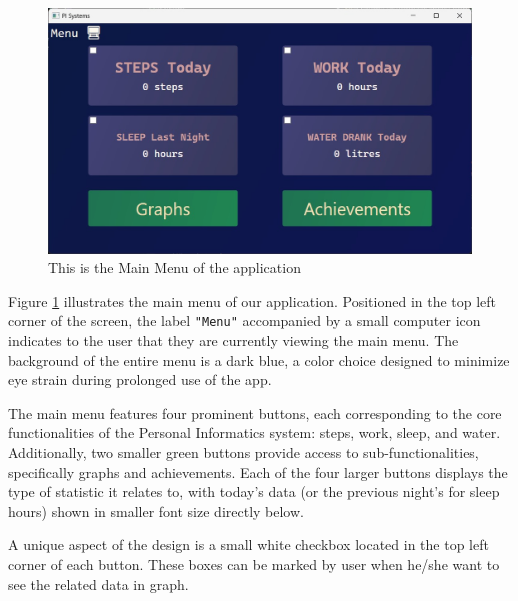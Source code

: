 \documentclass[12pt]{article}
\begin{document}
\begin{figure}[h!]
  \centering
  \includegraphics[width = \linewidth]{Main Menu}
  \caption{This is the Main Menu of the application}
  \label{fig:Menu}
\end{figure}

Figure \ref{fig:Menu} illustrates the main menu of our application. Positioned in the top left
corner of the screen, the label \texttt{"Menu"} accompanied by a small computer icon indicates
to the user that they are currently viewing the main menu. The background of the 
entire menu is a dark blue, a color choice designed to minimize eye strain during 
prolonged use of the app.\par

The main menu features four prominent buttons, each corresponding to the core 
functionalities of the Personal Informatics system: steps, work, sleep, and water.
Additionally, two smaller green buttons provide access to sub-functionalities, 
specifically graphs and achievements. Each of the four larger buttons displays 
the type of statistic it relates to, with today's data (or the previous night's
for sleep hours) shown in smaller font size directly below.\par

A unique aspect of the design is a small white checkbox located in the top left 
corner of each button. These boxes can be marked by user when he/she want to see
the related data in graph.\par
\end{document}
